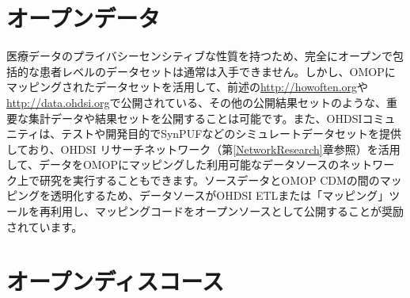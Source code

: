 \documentclass[
  11pt]{book}
\theoremstyle{definition}
\theoremstyle{definition}
\theoremstyle{definition}
\theoremstyle{definition}
\theoremstyle{remark}
\begin{document}
\section{オープンデータ}\label{ux30aaux30fcux30d7ux30f3ux30c7ux30fcux30bf}


医療データのプライバシーセンシティブな性質を持つため、完全にオープンで包括的な患者レベルのデータセットは通常は入手できません。しかし、OMOPにマッピングされたデータセットを活用して、前述の\url{http://howoften.org}や\url{http://data.ohdsi.org}で公開されている、その他の公開結果セットのような、重要な集計データや結果セットを公開することは可能です。また、OHDSIコミュニティは、テストや開発目的でSynPUFなどのシミュレートデータセットを提供しており、OHDSI リサーチネットワーク（第\ref{NetworkResearch}章参照）を活用して、データをOMOPにマッピングした利用可能なデータソースのネットワーク上で研究を実行することもできます。ソースデータとOMOP CDMの間のマッピングを透明化するため、データソースがOHDSI ETLまたは「マッピング」ツールを再利用し、マッピングコードをオープンソースとして公開することが奨励されています。

\section{オープンディスコース}\label{ux30aaux30fcux30d7ux30f3ux30c7ux30a3ux30b9ux30b3ux30fcux30b9}

\end{document}
